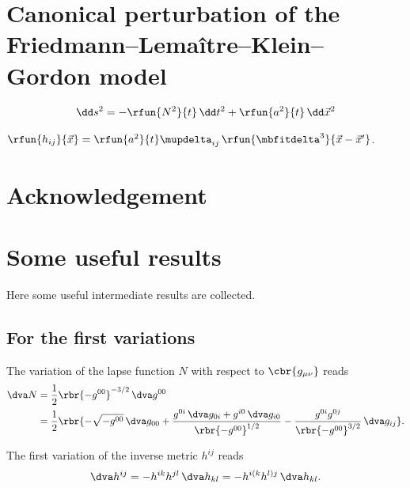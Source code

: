 \documentclass[a4paper,11pt]{article}
\begin{document}
\section{Canonical perturbation of the Friedmann--Lema\^itre--Klein--Gordon 
model}


\begin{align}
\dd s^2 = -\rfun{N^2}{t}\,\dd t^2 + \rfun{a^2}{t}\,\dd \vec{x}^2
\end{align}

$\rfun{h_{ij}}{\vec{x}} = \rfun{a^2}{t}\mupdelta_{ij}\,
\rfun{\mbfitdelta^3}{\vec{x}-\vec{x}'}$.


\section*{Acknowledgement}


\appendix

\section{Some useful results}
\label{sec:useful-results}

Here some useful intermediate results are collected.

\subsection{For the first variations}
\label{ssec:first-var}

The variation of the lapse function $N$ with respect to $\cbr{g_{\mu\nu}}$ reads
\begin{align}
\dva N &= \frac{1}{2}\rbr{-g^{00}}^{-3/2}\,\dva g^{00}
\\
&= \frac{1}{2}\rbr{-\sqrt{-g^{00}}\,\dva g_{00}
+\frac{g^{0i}\,\dva g_{0i}+g^{i0}\,\dva g_{i0}}{\rbr{-g^{00}}^{1/2}}
-\frac{g^{0i}g^{0j}}{\rbr{-g^{00}}^{3/2}}\,\dva g_{ij}}.
\end{align}

The first variation of the inverse metric $h^{ij}$ reads
\begin{align}
\dva h^{ij} = -h^{ik}h^{jl}\,\dva h_{kl} = - h^{i(k}h^{l)j}\,\dva h_{kl}.
\label{eq:dva-hijup-1}
\end{align}
\end{document}
